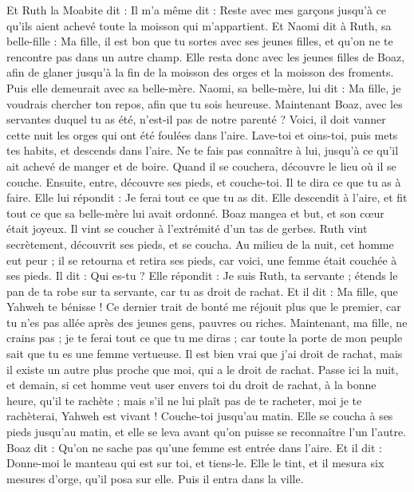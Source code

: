 \begin{multicols}{2}
Et Ruth la Moabite dit : Il m'a même dit : Reste avec mes garçons jusqu'à ce qu'ils aient achevé toute la moisson qui m'appartient.
Et Naomi dit à Ruth, sa belle-fille : Ma fille, il est bon que tu sortes avec ses jeunes filles, et qu'on ne te rencontre pas dans un autre champ.
Elle resta donc avec les jeunes filles de Boaz, afin de glaner jusqu'à la fin de la moisson des orges et la moisson des froments. Puis elle demeurait avec sa belle-mère.
\VerseOne{}Naomi, sa belle-mère, lui dit : Ma fille, je voudrais chercher ton repos, afin que tu sois heureuse.
Maintenant Boaz, avec les servantes duquel tu as été, n'est-il pas de notre parenté ? Voici, il doit vanner cette nuit les orges qui ont été foulées dans l'aire.
Lave-toi et oins-toi, puis mets tes habits, et descends dans l'aire. Ne te fais pas connaître à lui, jusqu'à ce qu'il ait achevé de manger et de boire.
Quand il se couchera, découvre le lieu où il se couche. Ensuite, entre, découvre ses pieds, et couche-toi. Il te dira ce que tu as à faire.
Elle lui répondit : Je ferai tout ce que tu as dit.
Elle descendit à l'aire, et fit tout ce que sa belle-mère lui avait ordonné.
Boaz mangea et but, et son cœur était joyeux. Il vint se coucher à l'extrémité d'un tas de gerbes. Ruth vint secrètement, découvrit ses pieds, et se coucha.
Au milieu de la nuit, cet homme eut peur ; il se retourna et retira ses pieds, car voici, une femme était couchée à ses pieds.
Il dit : Qui es-tu ? Elle répondit : Je suis Ruth, ta servante ; étends le pan de ta robe sur ta servante, car tu as droit de rachat.
Et il dit : Ma fille, que Yahweh te bénisse ! Ce dernier trait de bonté me réjouit plus que le premier, car tu n'es pas allée après des jeunes gens, pauvres ou riches.
Maintenant, ma fille, ne crains pas ; je te ferai tout ce que tu me diras ; car toute la porte de mon peuple sait que tu es une femme vertueuse.
Il est bien vrai que j'ai droit de rachat, mais il existe un autre plus proche que moi, qui a le droit de rachat.
Passe ici la nuit, et demain, si cet homme veut user envers toi du droit de rachat, à la bonne heure, qu'il te rachète ; mais s'il ne lui plaît pas de te racheter, moi je te rachèterai, Yahweh est vivant ! Couche-toi jusqu'au matin.
Elle se coucha à ses pieds jusqu'au matin, et elle se leva avant qu'on puisse se reconnaître l'un l'autre. Boaz dit : Qu'on ne sache pas qu'une femme est entrée dans l'aire.
Et il dit : Donne-moi le manteau qui est sur toi, et tiens-le. Elle le tint, et il mesura six mesures d'orge, qu'il posa sur elle. Puis il entra dans la ville.

\end{multicols}
